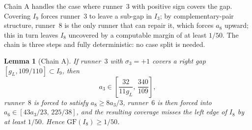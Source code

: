 \documentclass[12pt,a4paper]{amsart}
\newtheorem{lemma}[theorem]{Lemma}
\theoremstyle{definition}
\theoremstyle{remark}
\newcommand{\GF}{\mathrm{GF}}
\begin{document}
Chain A handles the case where runner~3 with positive sign covers the gap. Covering $I_9$
forces runner~3 to leave a sub-gap in $I_3$; by complementary-pair structure, runner~8 is
the only runner that can repair it, which forces $a_8$ upward; this in turn leaves $I_8$
uncovered by a computable margin of at least $1/50$. The chain is three steps and fully
deterministic: no case split is needed.

\begin{lemma}[Chain A]\label{lem:chainA}
If runner~$3$ with $\sigma_3=+1$ covers a right gap $[g_L,109/110]\subset I_9$, then
\[
  a_3 \in \left[\frac{32}{11g_L},\,\frac{340}{109}\right],
\]
runner~$8$ is forced to satisfy $a_8\ge 8a_3/3$, runner~$6$ is then forced into
$a_6\in[43a_3/23,\,225/38]$, and the resulting coverage misses the left edge of $I_8$ by
at least $1/50$. Hence $\GF(I_8)\ge 1/50$.
\end{lemma}
\end{document}
